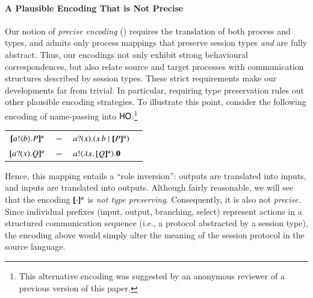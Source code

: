 \documentclass[runningheads]{llncs}
\begin{document}
\paragraph{A Plausible Encoding That is Not Precise}
Our notion of \emph{precise encoding} () 
requires the translation of both process and types, and 
admits only process mappings that preserve session types
\emph{and} are fully abstract. Thus, our encodings 
not only exhibit  strong behavioural correspondences, but also 
 relate source and target processes with  
communication structures described by session types.
These strict requirements make our developments far from trivial.
In particular, requiring type preservation rules out other plausible encoding strategies.
To illustrate this point,
consider the  following encoding of %
name-passing 
into $\mathsf{HO}$:\footnote{This alternative  encoding was suggested by an anonymous reviewer of a previous version of this paper.} %
\begin{center}
\begin{tabular}{rcll}
  $[\!\![a ! \langle b \rangle . P]\!\!]^u$	&$=$&	$a ? (x) .( x\, {b} \;|\; [\!\![P]\!\!]^u)$ \\
  $[\!\![a ? (x) . Q]\!\!]^u$	&$=$&	$a ! \langle \lambda x.\,[\!\![Q]\!\!]^u \rangle . \mathbf{0}$
\end{tabular}
\end{center}
Hence, this mapping entails  a 
``role inversion'': outputs are translated into inputs, and inputs are translated into outputs. 
Although fairly reasonable, we will see that the encoding $[\!\![\cdot]\!\!]^u$  
is \emph{not type preserving}. Consequently, it is also not \emph{precise}.
Since individual prefixes (input, output, branching, select) 
represent actions in a structured communication sequence (i.e., a protocol abstracted by a session type),
the encoding above would simply alter the meaning of the session protocol in the source language.

\end{document}
